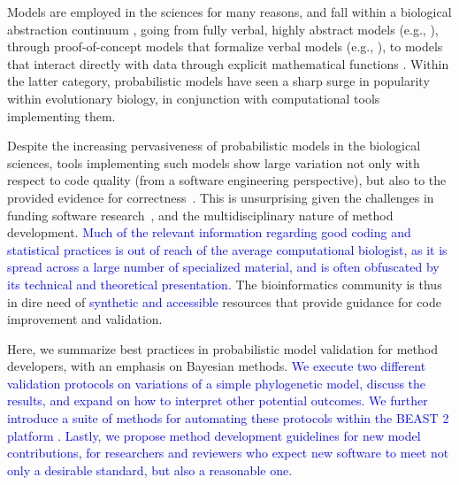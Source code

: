 \documentclass[oneside]{article}
\begin{document}
Models are employed in the sciences for many reasons, and fall within a biological abstraction continuum \citep{servedio14}, going from fully verbal, highly abstract models (e.g., \citealt{vanvalen73}), through proof-of-concept models that formalize verbal models (e.g., \citealt{maynard78,reinhold99,mendes18}), to models that interact directly with data through explicit mathematical functions \citep{yule24,felsenstein73,hky,hudson90}. 
Within the latter category, probabilistic models have seen a sharp surge in popularity within evolutionary biology, in conjunction with computational tools implementing them.

Despite the increasing pervasiveness of probabilistic models in the biological sciences, tools implementing such models show large variation not only with respect to code quality (from a software engineering perspective), but also to the provided evidence for correctness~\citep{darriba18}.
This is unsurprising given the challenges in funding software research~\citep{siepel19}, and the multidisciplinary nature of method development.
\textcolor{blue}{Much of the relevant information regarding good coding and statistical practices is out of reach of the average computational biologist, as it is spread across a large number of specialized material, and is often obfuscated by its technical and theoretical presentation.}
The bioinformatics community is thus in dire need of \textcolor{blue}{synthetic and accessible} resources that provide guidance for code improvement and validation.

Here, we summarize best practices in probabilistic model validation for method developers, with an emphasis on Bayesian methods.
\textcolor{blue}{We execute two different validation protocols on variations of a simple phylogenetic model, discuss the results, and expand on how to interpret other potential outcomes.
We further introduce a suite of methods for automating these protocols within the BEAST 2 platform \citep{beast25}.
Lastly, we propose method development guidelines for new model contributions, for researchers and reviewers who expect new software to meet not only a desirable standard, but also a reasonable one.
}

\end{document}
